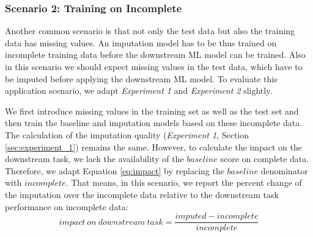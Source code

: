 \subsubsection{Scenario 2: Training on Incomplete}
\label{sec:scenario_2}
%
Another common scenario is that not only the test data but also the training data has missing values. An imputation model has to be thus trained on incomplete training data before the downstream ML model can be trained. Also in this scenario we should expect missing values in the test data, which have to be imputed before applying the downstream ML model. To evaluate this application scenario, we adapt \emph{Experiment 1} and \emph{Experiment 2} slightly.

We first introduce missing values in the training set as well as the test set and then train the baseline and imputation models based on these incomplete data. The calculation of the imputation quality (\emph{Experiment 1}, Section \ref{sec:experiment_1}) remains the same. However, to calculate the impact on the downstream task, we lack the availability of the $baseline$ score on complete data. Therefore, we adapt Equation \ref{eq:impact} by replacing the $baseline$ denominator with $incomplete$. That means, in this scenario, we report the percent change of the imputation over the incomplete data relative to the downstream task performance on incomplete data:
%
\begin{equation}
	impact\ on \ downstream\ task = \frac{imputed - incomplete}{incomplete}
	\label{eq:impact_scenario2}
\end{equation}
%
